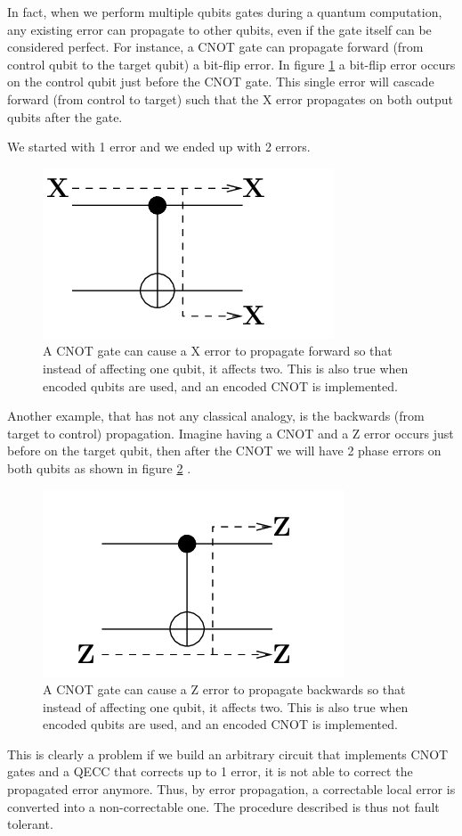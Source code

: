 In fact, when we perform multiple qubits gates during a quantum computation, any existing error can propagate to other qubits, even if the gate itself can be considered perfect.
For instance, a CNOT gate can propagate forward (from control qubit to the target qubit) a bit-flip error. In figure \ref{fig:CNOT_prop} a bit-flip error occurs on the control qubit just before the CNOT gate.
This single error will cascade forward (from control to target) such that the X error propagates on both output qubits after the gate.

We started with 1 error and we ended up with 2 errors. 
\begin{figure}[h!]
    \centering
    \includegraphics[scale=0.5]{Mainmatter/images/XCNOT.png}
    \caption{A CNOT gate can cause a X error to propagate forward so that instead of affecting one qubit, it affects two. This is also true when encoded qubits are used, and an encoded CNOT is implemented.}
    \label{fig:CNOT_prop}
\end{figure}

Another example, that has not any classical analogy, is the backwards (from target to control) propagation. Imagine having a CNOT and a Z error occurs just before on the target qubit, then after the CNOT we will have 2 phase errors on both qubits as shown in figure \ref{fig:CNOT_prop2} .

\begin{figure}[h!]
    \centering
    \includegraphics[scale=0.5]{Mainmatter/images/ZCNOT.png}
    \caption{A CNOT gate can cause a Z error to propagate backwards so that instead of affecting one qubit, it affects two. This is also true when encoded qubits are used, and an encoded CNOT is implemented.}
    \label{fig:CNOT_prop2}
\end{figure}
This is clearly a problem if we build an arbitrary circuit that implements CNOT gates and a QECC that corrects up to 1 error, it is not able to correct the propagated error anymore.
Thus, by error propagation, a correctable local error is converted into a non-correctable one. The procedure described is thus not fault tolerant.




